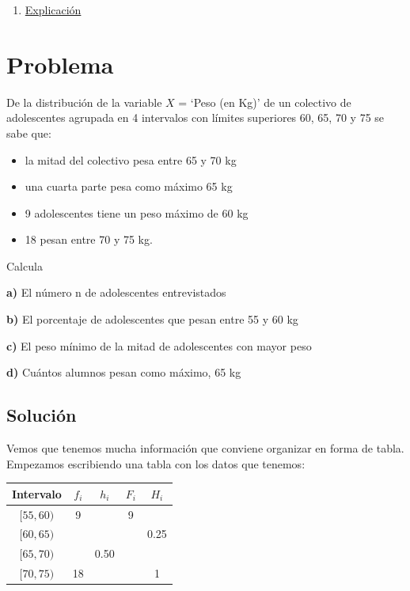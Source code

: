 \documentclass[
]{book}
\providecommand{\tightlist}{%
  \setlength{\itemsep}{0pt}\setlength{\parskip}{0pt}}
\begin{document}
\begin{enumerate}
\def\labelenumi{\alph{enumi})}
\tightlist
\item
  \href{https://1fjmanzano.github.io/bioestadistica/tipos-de-variables.html}{Explicación}
\end{enumerate}

\hypertarget{problema-1}{%
\section{Problema}\label{problema-1}}

De la distribución de la variable \(X\) = `Peso (en Kg)' de un colectivo de adolescentes agrupada en 4 intervalos con límites superiores 60, 65, 70 y 75 se sabe que:

\begin{itemize}
\tightlist
\item
  la mitad del colectivo pesa entre 65 y 70 kg
\item
  una cuarta parte pesa como máximo 65 kg
\item
  9 adolescentes tiene un peso máximo de 60 kg
\item
  18 pesan entre 70 y 75 kg.
\end{itemize}

Calcula

\textbf{a)} El número n de adolescentes entrevistados

\textbf{b)} El porcentaje de adolescentes que pesan entre 55 y 60 kg

\textbf{c)} El peso mínimo de la mitad de adolescentes con mayor peso

\textbf{d) } Cuántos alumnos pesan como máximo, 65 kg

\hypertarget{soluciuxf3n-5}{%
\subsection{Solución}\label{soluciuxf3n-5}}

Vemos que tenemos mucha información que conviene organizar en forma de tabla. Empezamos escribiendo una tabla con los datos que tenemos:

\begin{longtable}[]{@{}ccccc@{}}
\toprule
Intervalo & \(f_i\) & \(h_i\) & \(F_i\) & \(H_i\)\tabularnewline
\midrule
\endhead
\([55,60)\) & 9 & & 9 &\tabularnewline
\([60,65)\) & & & & 0.25\tabularnewline
\([65,70)\) & & 0.50 & &\tabularnewline
\([70,75)\) & 18 & & & 1\tabularnewline
\bottomrule
\end{longtable}
\end{document}
